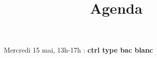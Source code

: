\documentclass[12pt]{article}
\title{\textbf{Agenda}}
\date{}
\begin{document}
\maketitle

\begin{itemize}
\item[Mercredi 15 mai, 13h-17h :] \textbf{ctrl type bac blanc}
\end{itemize}
\end{document}

